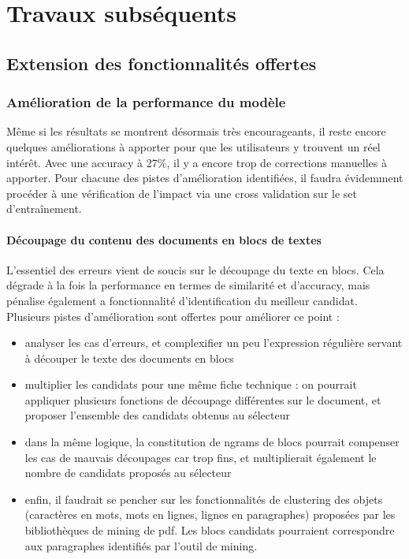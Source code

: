 \part{Travaux subséquents}

\chapter{Extension des fonctionnalités offertes}

    \section{Amélioration de la performance du modèle}

    Même si les résultats se montrent désormais très encourageants, il reste encore quelques améliorations à apporter pour que les utilisateurs y trouvent un réel intérêt.
    Avec une accuracy à 27\%, il y a encore trop de corrections manuelles à apporter.
    Pour chacune des pistes d'amélioration identifiées, il faudra évidemment procéder à une vérification de l'impact via une cross validation sur le set d'entraînement.

    \subsection{Découpage du contenu des documents en blocs de textes}

    L'essentiel des erreurs vient de soucis sur le découpage du texte en blocs.
    Cela dégrade à la fois la performance en termes de similarité et d'accuracy, mais pénalise également a fonctionnalité d'identification du meilleur candidat.
    Plusieurs pistes d'amélioration sont offertes pour améliorer ce point : 
    \begin{itemize}
        \item analyser les cas d'erreurs, et complexifier un peu l'expression régulière servant à découper le texte des documents en blocs
        \item multiplier les candidats pour une même fiche technique : on pourrait appliquer plusieurs fonctions de découpage différentes sur le document, et proposer l'ensemble des candidats obtenus au sélecteur
        \item dans la même logique, la constitution de \og ngrams de blocs \fg pourrait compenser les cas de mauvais découpages car trop fins, et multiplierait également le nombre de candidats proposés au sélecteur
        \item enfin, il faudrait se pencher sur les fonctionnalités de clustering des objets (caractères en mots, mots en lignes, lignes en paragraphes) proposées par les bibliothèques de mining de pdf. Les blocs candidats pourraient correspondre aux paragraphes identifiés par l'outil de mining.
    \end{itemize}

